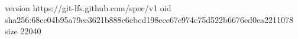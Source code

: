 version https://git-lfs.github.com/spec/v1
oid sha256:68cc04b95a79ee3621b888c6ebcd198eee67e974c75d522b6676ed0ea2211078
size 22040
